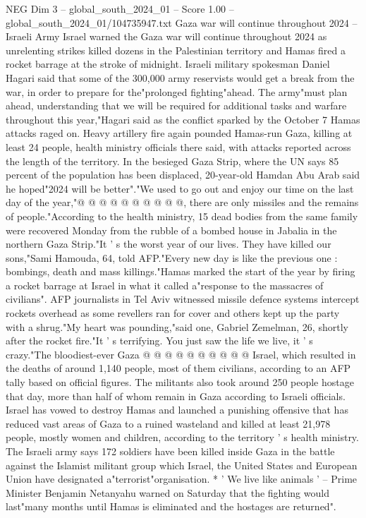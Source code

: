 \begin{textsample}{NEG Dim 3 – global\_south\_2024\_01 – Score 1.00 – global\_south\_2024\_01/104735947.txt}  \label{ex:f3_neg_102}
Gaza war will continue throughout 2024 -- Israeli Army Israel warned the Gaza war will continue throughout 2024 as unrelenting strikes killed dozens in the Palestinian territory and Hamas fired a rocket barrage at the stroke of midnight.
Israeli military spokesman Daniel Hagari said that some of the 300,000 army reservists would get a break from the war, in order to prepare for the"prolonged fighting"ahead.
The army"must plan ahead, understanding that we will be required for additional tasks and warfare throughout this year,"Hagari said as the conflict sparked by the October 7 Hamas attacks raged on.
Heavy artillery fire again pounded Hamas-run Gaza, killing at least 24 people, health ministry officials there said, with attacks reported across the length of the territory.
In the besieged Gaza Strip, where the UN says 85 percent of the population has been displaced, 20-year-old Hamdan Abu Arab said he hoped"2024 will be better"."We used to go out and enjoy our time on the last day of the year,"@ @ @ @ @ @ @ @ @ @, there are only missiles and the remains of people."According to the health ministry, 15 dead bodies from the same family were recovered Monday from the rubble of a bombed house in Jabalia in the northern Gaza Strip."It ' s the worst year of our lives.
They have killed our sons,"Sami Hamouda, 64, told AFP."Every new day is like the previous one : bombings, death and mass killings."Hamas marked the start of the year by firing a rocket barrage at Israel in what it called a"response to the massacres of civilians".
AFP journalists in Tel Aviv witnessed missile defence systems intercept rockets overhead as some revellers ran for cover and others kept up the party with a shrug."My heart was pounding,"said one, Gabriel Zemelman, 26, shortly after the rocket fire."It ' s terrifying.
You just saw the life we live, it ' s crazy."The bloodiest-ever Gaza @ @ @ @ @ @ @ @ @ @ Israel, which resulted in the deaths of around 1,140 people, most of them civilians, according to an AFP tally based on official figures.
The militants also took around 250 people hostage that day, more than half of whom remain in Gaza according to Israeli officials.
Israel has vowed to destroy Hamas and launched a punishing offensive that has reduced vast areas of Gaza to a ruined wasteland and killed at least 21,978 people, mostly women and children, according to the territory ' s health ministry.
The Israeli army says 172 soldiers have been killed inside Gaza in the battle against the Islamist militant group which Israel, the United States and European Union have designated a"terrorist"organisation. * ' We live like animals ' -- Prime Minister Benjamin Netanyahu warned on Saturday that the fighting would last"many months until Hamas is eliminated and the hostages are returned".

\end{textsample}
